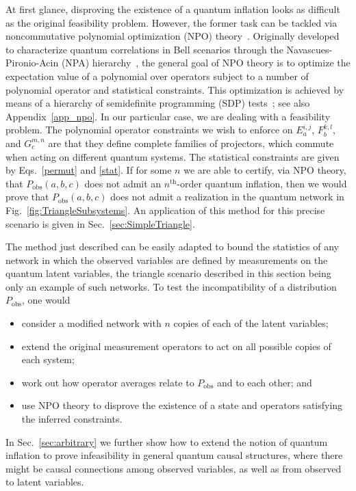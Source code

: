 \documentclass[superscriptaddress,aps,prx,nofootinbib,twocolumn,twoside,reprint,letterpaper,longbibliography]{revtex4-2}
\begin{document}
At first glance, disproving the existence of a quantum inflation looks as difficult as the original feasibility problem.
However, the former task can be tackled via noncommutative polynomial optimization (NPO) theory~\cite{npo}.
Originally developed to characterize quantum correlations in Bell scenarios through the Navascues-Pironio-Acin (NPA) hierarchy~\cite{npa,npa2}, the general goal of NPO theory is to optimize the expectation value of a polynomial over operators subject to a number of polynomial operator and statistical constraints.
This optimization is achieved by means of a hierarchy of semidefinite programming (SDP) tests~\cite{sdp}; see also Appendix~\ref{app_npo}.
In our particular case, we are dealing with a feasibility problem. The polynomial operator constraints we wish to enforce on $E^{i,j}_a$, $F^{k,l}_b$, and $G^{m,n}_c$ are that they define complete families of projectors, which commute when acting on different quantum systems.
The statistical constraints are given by Eqs.~\eqref{permut} and \eqref{stat}.
If for some $n$ we are able to certify, via NPO theory, that $P_\text{obs}(a,b,c)$ does not admit an $n^\text{th}$-order quantum inflation, then we would prove that $P_\text{obs}(a,b,c)$ does not admit a realization in the quantum network in Fig.~\ref{fig:TriangleSubsystems}. An application of this method for this precise scenario is given in Sec.~\ref{sec:SimpleTriangle}.

The method just described can be easily adapted to bound the statistics of any network in which the observed variables are defined by measurements on the quantum latent variables, the triangle scenario described in this section being only an example of such networks.
To test the incompatibility of a distribution $P_\text{obs}$, one would
\begin{itemize}
\item consider a modified network with $n$ copies of each of the latent variables;
\item extend the original measurement operators to act on all possible copies of each system;
\item work out how operator averages relate to $P_\text{obs}$ and to each other; and
\item use NPO theory to disprove the existence of a state and operators satisfying the inferred constraints.
\end{itemize}
In Sec.~\ref{sec:arbitrary} we further show how to extend the notion of quantum inflation to prove infeasibility in general quantum causal structures, where there might be causal connections among observed variables, as well as from observed to latent variables.
\end{document}
